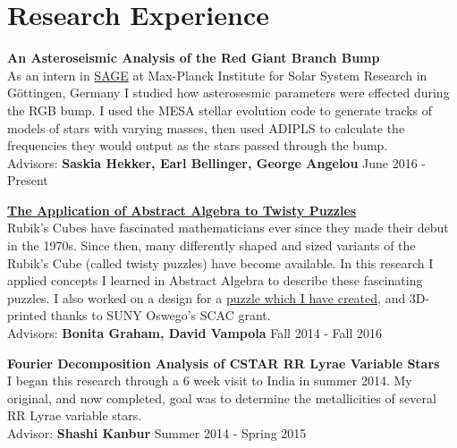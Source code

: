 \documentclass[8pt]{article}
\renewenvironment{itemize}{
  \begin{list}{}{
    \setlength{\leftmargin}{1.5em}
  }
}{
  \end{list}
}
\begin{document}
\section*{Research Experience}
\begin{itemize}

\item \textbf{An Asteroseismic Analysis of the Red Giant Branch Bump}\\
As an intern in \href{http://www.mps.mpg.de/sage}{SAGE} at Max-Planck Institute for Solar System Research in G{\"o}ttingen, Germany I studied how asterosesmic parameters were effected during the RGB bump. I used the MESA
stellar evolution code to generate tracks of models of stars with varying masses, then used ADIPLS to calculate the frequencies they would output as the stars passed through the
bump.\\
Advisors: \textbf{Saskia Hekker, Earl Bellinger, George Angelou} \hfill June 2016 - Present

\item \href{https://kroffo.github.io/docs/thesis.pdf}{\textbf{The Application of Abstract Algebra to Twisty Puzzles}}\\
Rubik's Cubes have fascinated mathematicians ever since they made their debut in the 1970s. Since then, many differently shaped and sized variants of the Rubik's Cube (called twisty puzzles) have become available. In this research I applied concepts I learned in Abstract Algebra to describe these fascinating puzzles. I also worked on a design for a \href{https://www.youtube.com/watch?v=17ll6TWm45M}{puzzle which I have created}, and 3D-printed thanks to SUNY Oswego's SCAC grant.\\
Advisors: \textbf{Bonita Graham, David Vampola} \hfill Fall 2014 - Fall 2016

\item \textbf{Fourier Decomposition Analysis of CSTAR RR Lyrae Variable Stars}\\
I began this research through a 6 week visit to India in summer 2014. My original, and now completed, goal was to determine the metallicities of several RR Lyrae variable stars.\\
Advisor: \textbf{Shashi Kanbur} \hfill Summer 2014 - Spring 2015

\end{itemize}
\end{document}
